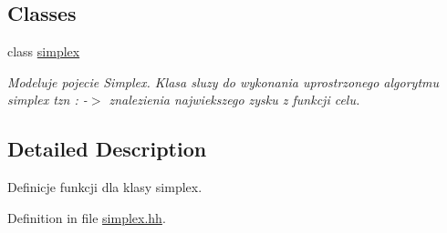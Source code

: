 \subsection*{Classes}
\begin{DoxyCompactItemize}
\item 
class \hyperlink{classsimplex}{simplex}
\begin{DoxyCompactList}\small\item\em Modeluje pojecie Simplex. Klasa sluzy do wykonania uprostrzonego algorytmu simplex tzn \-: -\/$>$ znalezienia najwiekszego zysku z funkcji celu. \end{DoxyCompactList}\end{DoxyCompactItemize}


\subsection{Detailed Description}
Definicje funkcji dla klasy simplex. 

Definition in file \hyperlink{simplex_8hh_source}{simplex.\-hh}.

